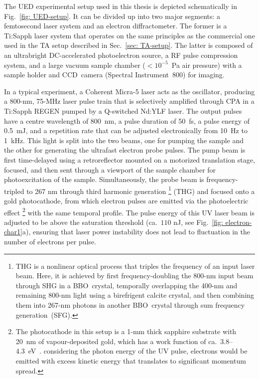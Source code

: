 The UED experimental setup used in this thesis is depicted schematically
in Fig.~\ref{fig: UED-setup}. It can be divided up into two major segments:
a femtosecond laser system and an electron diffractometer.
The former is a Ti:Sapph laser system that operates on the same
principles as the commercial one used in the TA setup described in Sec.~\ref{sec: TA-setup}.
The latter is composed of an ultrabright DC-accelerated photoelectron source,
a RF pulse compression system, and a large vacuum sample chamber ($< 10^{-5}$~Pa air pressure)
with a sample holder and CCD~camera (Spectral Instrument~800) for imaging.

In a typical experiment, a Coherent Micra-5 laser acts as the oscillator,
producing a 800-nm, 75-MHz laser pulse train that is selectively amplified through CPA in
a Ti:Sapph REGEN pumped by a Q-switched Nd:YLF laser. The output pulses have a centre wavelength of 800~nm,
a pulse duration of 50~fs, a pulse energy of 0.5~mJ, and a repetition rate that can be
adjusted electronically from 10~Hz to 1~kHz. This light is split into the two beams, one for
pumping the sample and the other for generating the ultrafast electron probe pulses.
The pump beam is first time-delayed using a retroreflector mounted on a motorized translation stage,
focused, and then sent through a viewport of the sample chamber for photoexcitation of the sample.
Simultaneously, the probe beam is frequency-tripled to 267 nm through third harmonic generation%
\footnote{THG is a nonlinear optical process that triples the frequency of an input laser beam.
Here, it is achieved by first frequency-doubling the 800-nm input beam through SHG in a BBO~crystal,
temporally overlapping the 400-nm and remaining 800-nm light using a birefrigent calcite crystal,
and then combining them into 267-nm photons in another BBO~crystal
through sum frequency generation~(SFG).} (THG)
and focused onto a gold photocathode, from which electron pulses are emitted via the photoelectric effect%
\footnote{The photocathode in this setup is a 1-mm thick sapphire substrate with
20~nm of vapour-deposited gold,
which has a work function of ca.~3.8--4.3~eV~\cite{Tsang1991, Aidelsburger2010}.
considering the photon energy of the UV pulse, electrons would be emitted with excess kinetic energy
that translates to significant momentum spread.} with the same temporal profile.
The pulse energy of this UV laser beam is adjusted to be above
the saturation threshold (ca.~$110$ nJ, see Fig.~\ref{fig: electron-char1}a), ensuring that
laser power instability does not lead to fluctuation in the number of electrons per pulse.
